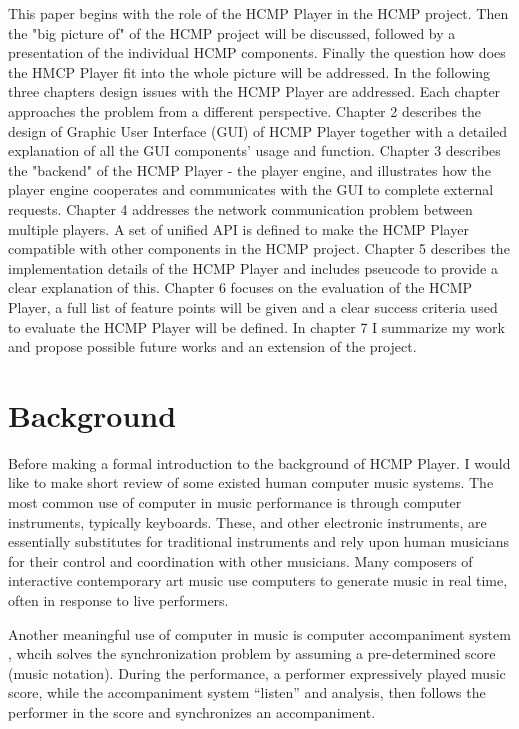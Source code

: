 This paper begins with the role of the HCMP Player in the HCMP project. Then
the "big picture of" of the HCMP project will be discussed, followed by a
presentation of the individual HCMP components. Finally the question how
does the HMCP Player fit into the whole picture will be addressed. In the
following three chapters design issues with the HCMP Player are addressed.
Each chapter approaches the problem from a different perspective. Chapter 2
describes the design of Graphic User Interface (GUI) of HCMP Player together
with a detailed explanation of all the GUI components' usage and function.
Chapter 3 describes the "backend" of the HCMP Player - the player engine,
and illustrates how the player engine cooperates and communicates with the
GUI to complete external requests. Chapter 4 addresses the network
communication problem between multiple players. A set of unified API is
defined to make the HCMP Player compatible with other components in the HCMP
project.  Chapter 5 describes the implementation details of the HCMP Player
and includes pseucode to provide a clear explanation of this. Chapter 6
focuses on the evaluation of the HCMP Player, a full list of feature points
will be given and a clear success criteria used to evaluate the HCMP Player
will be defined.  In chapter 7 I summarize my work and propose possible
future works and an extension of the project.

\section{Background}

Before making a formal introduction to the background of HCMP Player. 
I would like to make short review of  
some existed human computer music systems. The most common use of computer in
music performance is through computer instruments, typically keyboards.
These, and other electronic instruments, are essentially substitutes for traditional
instruments and rely upon human musicians for their control and coordination with
other musicians. Many composers of interactive contemporary art music use computers
to generate music in real time, often in response to live performers.

Another meaningful use of computer in music is computer accompaniment system 
\cite{Roger:89}, 
whcih solves the synchronization problem by assuming a pre-determined 
score (music notation). During the performance, a performer expressively 
played music score, while the accompaniment system ``listen'' and analysis, 
then follows the performer 
in the score and synchronizes an accompaniment.

